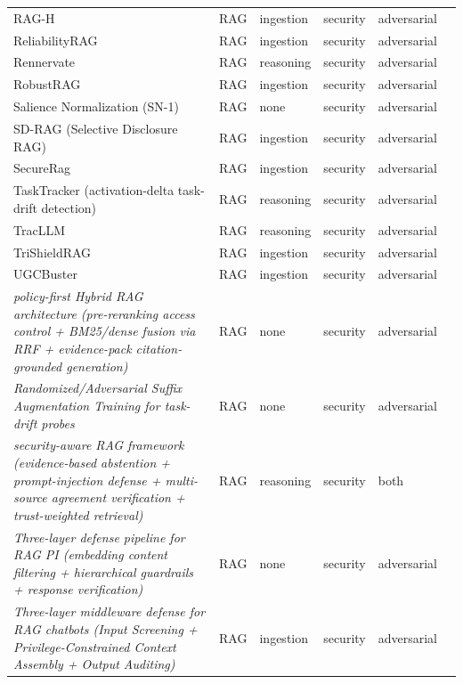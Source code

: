 \begin{longtable}{@{}p{}lllll@{}}
RAG-H & RAG & ingestion & security & adversarial & \cite{ceraku-2026-ragh} \\
ReliabilityRAG & RAG & ingestion & security & adversarial & \cite{shen-2025-reliabilityrag} \\
Rennervate & RAG & reasoning & security & adversarial & \cite{zhong-2025-attention} \\
RobustRAG & RAG & ingestion & security & adversarial & \cite{xiang-2024-certifiably} \\
Salience Normalization (SN-1) & RAG & none & security & adversarial & \cite{zhou-2026-salience} \\
SD-RAG (Selective Disclosure RAG) & RAG & ingestion & security & adversarial & \cite{masoud-2026-sdrag} \\
SecureRag & RAG & ingestion & security & adversarial & \cite{mishra-2025-securerag} \\
TaskTracker (activation-delta task-drift detection) & RAG & reasoning & security & adversarial & \cite{abdelnabi-2024-get} \\
TracLLM & RAG & reasoning & security & adversarial & \cite{wang-2025-tracllm} \\
TriShieldRAG & RAG & ingestion & security & adversarial & \cite{mohanty-2026-trishieldrag} \\
UGCBuster & RAG & ingestion & security & adversarial & \cite{kaya-2025-meets} \\
\emph{policy-first Hybrid RAG architecture (pre-reranking access control + BM25/dense fusion via RRF + evidence-pack citation-grounded generation)} & RAG & none & security & adversarial & \cite{gudipuri-2026-enterprise} \\
\emph{Randomized/Adversarial Suffix Augmentation Training for task-drift probes} & RAG & none & security & adversarial & \cite{rahman-2026-bypassing} \\
\emph{security-aware RAG framework (evidence-based abstention + prompt-injection defense + multi-source agreement verification + trust-weighted retrieval)} & RAG & reasoning & security & both & \cite{kolavennu-2026-securityaware} \\
\emph{Three-layer defense pipeline for RAG PI (embedding content filtering + hierarchical guardrails + response verification)} & RAG & none & security & adversarial & \cite{ramakrishnan-2025-securing} \\
\emph{Three-layer middleware defense for RAG chatbots (Input Screening + Privilege-Constrained Context Assembly + Output Auditing)} & RAG & ingestion & security & adversarial & \cite{saleem-2026-layered} \\

\end{longtable}
